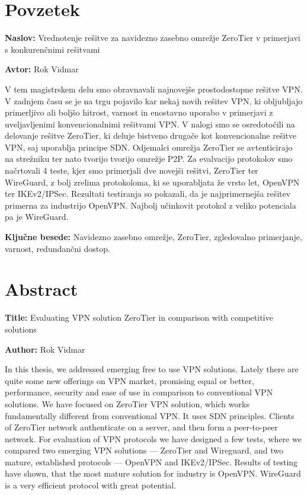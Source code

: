 \documentclass[a4paper, 12pt]{book}
\newcommand{\ttitle}{Vrednotenje rešitve za navidezno zasebno omrežje ZeroTier v primerjavi s konkurenčnimi rešitvami}
\newcommand{\ttitleEn}{Evaluating VPN solution ZeroTier in comparison with competitive solutions}
\newcommand{\tauthor}{Rok Vidmar}
\newcommand{\tkeywords}{Navidezno zasebno omrežje, ZeroTier, zgledovalno primerjanje, varnost, redundančni dostop}
\newcommand{\clearemptydoublepage}{\newpage{\pagestyle{empty}\cleardoublepage}}
\begin{document}
\chapter*{Povzetek}

\noindent\textbf{Naslov:} \ttitle
\bigskip

\noindent\textbf{Avtor:} \tauthor
\bigskip

\noindent V tem magistrskem delu smo obravnavali najnovejše prostodostopne rešitve VPN. V zadnjem času se je na trgu pojavilo kar nekaj novih rešitev VPN, ki obljubljajo primerljivo ali boljšo hitrost, varnost in enostavno uporabo v primerjavi z uveljavljenimi konvencionalnimi rešitvami VPN. V nalogi smo se osredotočili na delovanje rešitve ZeroTier, ki deluje bistveno drugače kot konvencionalne rešitve VPN, saj uporablja principe SDN. Odjemalci omrežja ZeroTier se avtenticirajo na strežniku ter nato tvorijo tvorijo omrežje P2P. Za evalvacijo protokolov smo načrtovali 4 teste, kjer smo primerjali dve novejši rešitvi, ZeroTier ter WireGuard, z bolj zrelima protokoloma, ki se uporabljata že vrsto let, OpenVPN ter IKEv2/IPSec. Rezultati testiranja so pokazali, da je najprimernejša rešitev primerna za industrijo OpenVPN. Najbolj učinkovit protokol z veliko potenciala pa je WireGuard.

\bigskip

\noindent\textbf{Ključne besede:} \tkeywords.
\clearemptydoublepage

\chapter*{Abstract}

\noindent\textbf{Title:} \ttitleEn
\bigskip

\noindent\textbf{Author:} \tauthor

\bigskip
\noindent In this thesis, we addressed emerging free to use VPN solutions. Lately there are quite some new offerings on VPN market, promising equal or better, performance, security and ease of use in comparison to conventional VPN solutions. We have focused on ZeroTier VPN solution, which works fundamentally different from conventional VPN. It uses SDN principles. Clients of ZeroTier network authenticate on a server, and then form a peer-to-peer network. For evaluation of VPN protocols we have designed a few tests, where we compared two emerging VPN solutions --- ZeroTier and Wireguard, and two mature, established protocols --- OpenVPN and IKEv2/IPSec. Results of testing have shown, that the most mature solution for industry is \mbox{OpenVPN}. WireGuard is a very efficient protocol with great potential.
\bigskip
\end{document}
